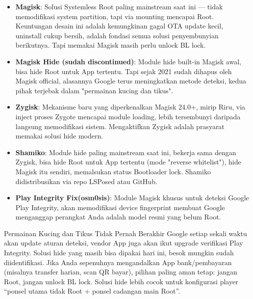 \begin{itemize}
  \item \textbf{Magisk}: Solusi Systemless Root paling mainstream saat ini — tidak memodifikasi system partition, tapi via mounting mencapai Root. Keuntungan desain ini adalah kemungkinan gagal OTA update kecil, uninstall cukup bersih, adalah fondasi semua solusi penyembunyian berikutnya. Tapi memakai Magisk masih perlu unlock BL lock.
  \item \textbf{Magisk Hide (sudah discontinued)}: Module hide built-in Magisk awal, bisa hide Root untuk App tertentu. Tapi sejak 2021 sudah dihapus oleh Magisk official, alasannya Google terus meningkatkan metode deteksi, kedua pihak terjebak dalam "permainan kucing dan tikus".
  \item \textbf{Zygisk}: Mekanisme baru yang diperkenalkan Magisk 24.0+, mirip Riru, via inject proses Zygote mencapai module loading, lebih tersembunyi daripada langsung memodifikasi sistem. Mengaktifkan Zygisk adalah prasyarat memakai solusi hide modern.
  \item \textbf{Shamiko}: Module hide paling mainstream saat ini, bekerja sama dengan Zygisk, bisa hide Root untuk App tertentu (mode "reverse whitelist"), hide Magisk itu sendiri, memalsukan status Bootloader lock. Shamiko didistribusikan via repo LSPosed atau GitHub.
  \item \textbf{Play Integrity Fix(osm0sis)}: Module Magisk khusus untuk deteksi Google Play Integrity, akan memodifikasi device fingerprint membuat Google menganggap perangkat Anda adalah model resmi yang belum Root.
\end{itemize}

\begin{tcbwarn}{Permainan Kucing dan Tikus Tidak Pernah Berakhir}
Google setiap sekali waktu akan update aturan deteksi, vendor App juga akan ikut upgrade verifikasi Play Integrity. Solusi hide yang masih bisa dipakai hari ini, besok mungkin sudah diidentifikasi. Jika Anda sepenuhnya mengandalkan App bank/pembayaran (misalnya transfer harian, scan QR bayar), pilihan paling aman tetap: jangan Root, jangan unlock BL lock. Solusi hide lebih cocok untuk konfigurasi player “ponsel utama tidak Root + ponsel cadangan main Root”.

\end{tcbwarn}


